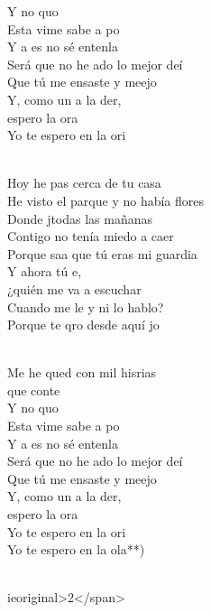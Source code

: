 \begin{cancion}[La orilla][Serko]
\begin{chorus}
	Y no quo\\
	Esta vime sabe a po\\
	Y a es no sé entenla\\
	Será que no he ado lo mejor deí\\
	Que tú me ensaste y meejo\\
	Y, como un a la der, \\
	espero la ora\\
	Yo te espero en la ori\\
	\end{chorus}%
	\jump\\
	Hoy he pas cerca de tu casa\\
He visto el parque y no había flores\\
	Donde jtodas las mañanas\\
Contigo no tenía miedo a caer\\
	Porque saa que tú eras mi guardia\\
	Y ahora tú e, \\
¿quién me va a escuchar\\
	Cuando me le y ni lo hablo?\\
	Porque te qro desde aquí jo\\\jump\\
	\begin{chorus}%
	Me he qued con mil hisrias \\
	que conte\\
	Y no quo\\
	Esta vime sabe a po\\
	Y a es no sé entenla\\
	Será que no he ado lo mejor deí\\
	Que tú me ensaste y meejo\\
	Y, como un a la der, \\
	espero la ora\\
	Yo te espero en la ori\\
	Yo te espero en la ola**)\\
	\end{chorus}%
	\jump\\
	ieoriginal>2</span>\\
\end{cancion}%

